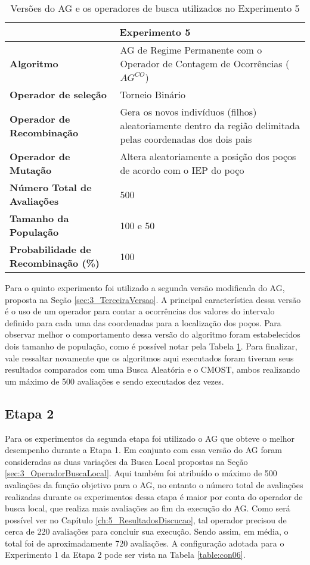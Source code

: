 \begin{table}[!htbp]
\centering
\caption{Versões do AG e os operadores de busca utilizados no Experimento 5}
\label{table:con05}
\begin{tabular}{|p{6cm}|p{9cm}|}
\hline
 
 \multicolumn{2}{|c|}{\textbf{Experimento 5}} \\ \hline
\textbf{Algoritmo} &AG de Regime Permanente com o Operador de Contagem de Ocorrências ($AG^{CO}$) \\ \hline
\textbf{Operador de seleção} & Torneio Binário \\ \hline
\textbf{Operador de Recombinação} & Gera os novos indivíduos (filhos) aleatoriamente dentro da região delimitada pelas coordenadas dos dois pais \\  \hline
\textbf{Operador de Mutação} & Altera aleatoriamente a posição dos poços de acordo com o IEP do poço \\ \hline
\textbf{Número Total de Avaliações} & 500 \\ \hline
\textbf{Tamanho da População} & 100 e 50 \\ \hline
\textbf{Probabilidade de Recombinação (\%)} & 100 \\ \hline
\end{tabular}
\end{table} 

Para o quinto experimento foi utilizado a segunda versão modificada do AG, proposta na Seção \ref{sec:3_TerceiraVersao}. A principal característica dessa versão é o uso de um operador para contar a ocorrências dos valores do intervalo definido para cada uma das coordenadas para a localização dos poços. Para observar melhor o comportamento dessa versão do algoritmo foram estabelecidos dois tamanho de população, como é possível notar pela Tabela \ref{table:con05}. Para finalizar, vale ressaltar novamente que os algoritmos aqui executados foram tiveram seus resultados comparados com uma Busca Aleatória e o CMOST, ambos realizando um  máximo de 500 avaliações e sendo executados dez vezes.

\subsection{Etapa 2}
\label{sec:4_Etapa2}
Para os experimentos da segunda etapa foi utilizado o AG que obteve o melhor desempenho durante a Etapa 1. Em conjunto com essa versão do AG foram consideradas as duas variações da Busca Local propostas na Seção \ref{sec:3_OperadorBuscaLocal}. Aqui também foi atribuído o máximo de 500 avaliações da função objetivo  para o AG, no entanto o número total de avaliações realizadas durante os experimentos dessa etapa é maior por conta do operador de busca local, que realiza mais avaliações ao fim da execução do AG. Como será possível ver no Capítulo \ref{ch:5_ResultadosDiscucao}, tal operador precisou de cerca de 220 avaliações para concluir sua execução. Sendo assim, em média, o total foi de aproximadamente 720 avaliações. A configuração adotada para o Experimento 1 da Etapa 2 pode ser vista na Tabela \ref{table:con06}.


